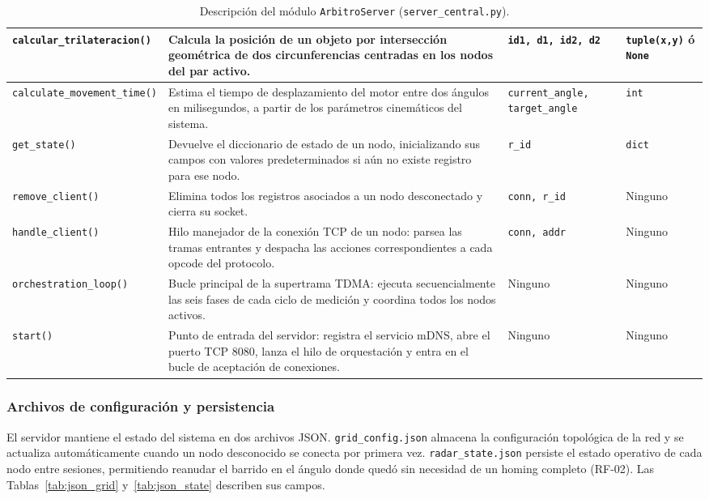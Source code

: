 \begin{table}[H]
{\begin{tabular}{|p{5cm}|p{9.5cm}|p{4cm}|p{3cm}|}
\hline
\texttt{calcular\_trilateracion()} & Calcula la posición de un objeto por intersección geométrica de dos circunferencias centradas en los nodos del par activo. & \texttt{id1, d1, id2, d2} & \texttt{tuple(x,y)} ó \texttt{None} \\
\hline
\texttt{calculate\_movement\_time()} & Estima el tiempo de desplazamiento del motor entre dos ángulos en milisegundos, a partir de los parámetros cinemáticos del sistema. & \texttt{current\_angle, target\_angle} & \texttt{int} \\
\hline
\texttt{get\_state()} & Devuelve el diccionario de estado de un nodo, inicializando sus campos con valores predeterminados si aún no existe registro para ese nodo. & \texttt{r\_id} & \texttt{dict} \\
\hline
\texttt{remove\_client()} & Elimina todos los registros asociados a un nodo desconectado y cierra su socket. & \texttt{conn, r\_id} & Ninguno \\
\hline
\texttt{handle\_client()} & Hilo manejador de la conexión TCP de un nodo: parsea las tramas entrantes y despacha las acciones correspondientes a cada opcode del protocolo. & \texttt{conn, addr} & Ninguno \\
\hline
\texttt{orchestration\_loop()} & Bucle principal de la supertrama TDMA: ejecuta secuencialmente las seis fases de cada ciclo de medición y coordina todos los nodos activos. & Ninguno & Ninguno \\
\hline
\texttt{start()} & Punto de entrada del servidor: registra el servicio mDNS, abre el puerto TCP 8080, lanza el hilo de orquestación y entra en el bucle de aceptación de conexiones. & Ninguno & Ninguno \\
\hline
\end{tabular}
}
\caption{Descripción del módulo \texttt{ArbitroServer} (\texttt{server\_central.py}).}
\label{tab:modulo_arbitro}
\end{table}

\subsubsection*{Archivos de configuración y persistencia}

El servidor mantiene el estado del sistema en dos archivos JSON. \texttt{grid\_config.json} almacena la configuración topológica de la red y se actualiza automáticamente cuando un nodo desconocido se conecta por primera vez. \texttt{radar\_state.json} persiste el estado operativo de cada nodo entre sesiones, permitiendo reanudar el barrido en el ángulo donde quedó sin necesidad de un homing completo (RF-02). Las Tablas~\ref{tab:json_grid} y~\ref{tab:json_state} describen sus campos.

